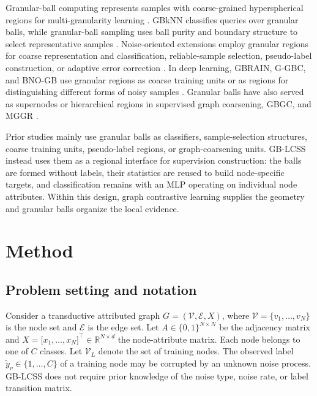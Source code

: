 \documentclass[preprint,12pt]{elsarticle}
\begin{document}
Granular-ball computing represents samples with coarse-grained hyperspherical regions for multi-granularity learning \cite{ref34}. GBkNN classifies queries over granular balls, while granular-ball sampling uses ball purity and boundary structure to select representative samples \cite{ref34,ref37}. Noise-oriented extensions employ granular regions for coarse representation and classification, reliable-sample selection, pseudo-label construction, or adaptive error correction \cite{ref35,ref36,ref52,ref53}. In deep learning, GBRAIN, G-GBC, and BNO-GB use granular regions as coarse training units or as regions for distinguishing different forms of noisy samples \cite{ref48,ref49,ref57}. Granular balls have also served as supernodes or hierarchical regions in supervised graph coarsening, GBGC, and MGGR \cite{ref54,ref55,ref56}.

Prior studies mainly use granular balls as classifiers, sample-selection structures, coarse training units, pseudo-label regions, or graph-coarsening units. GB-LCSS instead uses them as a regional interface for supervision construction: the balls are formed without labels, their statistics are reused to build node-specific targets, and classification remains with an MLP operating on individual node attributes. Within this design, graph contrastive learning supplies the geometry and granular balls organize the local evidence.

\FloatBarrier

\section{Method}\label{sec:3}

\subsection{Problem setting and notation}\label{sec:3.1}

Consider a transductive attributed graph \(G = (\mathcal{V},\mathcal{E},X)\), where \(\mathcal{V} = \{ v_{1},\ldots,v_{N}\}\) is the node set and \(\mathcal{E}\) is the edge set. Let \(A \in \{ 0,1\}^{N \times N}\) be the adjacency matrix and \(X = \lbrack x_{1},\ldots,x_{N}\rbrack^{\top} \in \mathbb{R}^{N \times d}\) the node-attribute matrix. Each node belongs to one of \(C\) classes. Let \(\mathcal{V}_{L}\) denote the set of training nodes. The observed label \({\widetilde{y}}_{v} \in \{ 1,\ldots,C\}\) of a training node may be corrupted by an unknown noise process. GB-LCSS does not require prior knowledge of the noise type, noise rate, or label transition matrix.
\end{document}
